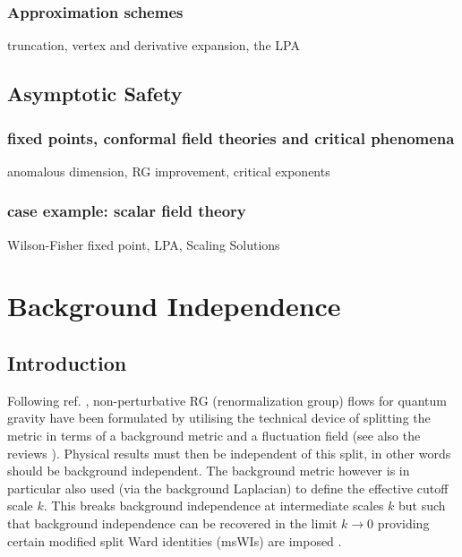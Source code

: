 \documentclass[11pt]{book} %
\numberwithin{equation}{chapter}
\begin{document}
\subsection{Approximation schemes}
truncation, vertex and derivative expansion, the LPA

\section{Asymptotic Safety}

\subsection{fixed points, conformal field theories and critical phenomena}
anomalous dimension, RG improvement, critical exponents
\subsection{case example: scalar field theory}
Wilson-Fisher fixed point, LPA, Scaling Solutions




\chapter{Background Independence}

\section{Introduction}
\label{sec:introduction}

Following ref. \cite{Reuter:1996cp},
non-perturbative RG (renormalization group) flows for quantum gravity have been formulated
by utilising the technical device of splitting the metric in terms of a background metric
and a fluctuation field (see also the reviews
\cite{Reuter:2012id, Percacci:2011fr, Niedermaier:2006wt, Nagy:2012ef, Litim:2011cp}).
Physical results must then be independent of this split, in other words should be background independent.
The background metric however is in particular also used (via the background Laplacian)
to define the effective cutoff scale $k$.
This breaks background independence at intermediate scales $k$ but such that background
independence can be recovered in the limit $k\to0$ providing certain modified split Ward
identities (msWIs) are imposed
\cite{Pawlowski:2005xe, Litim:2002hj, Bridle:2013sra, Reuter:1997gx, Litim:1998nf, Litim:2002ce,
Manrique:2009uh, Manrique:2010mq, Manrique:2010am, Dietz:2015owa, Safari:2015dva}.
\end{document}
